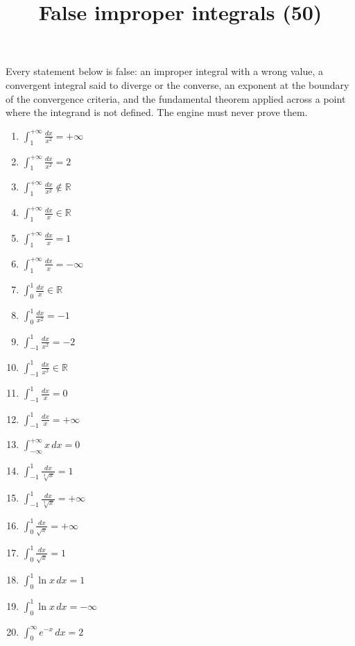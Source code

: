 \documentclass[11pt,a4paper]{article}
\title{False improper integrals (50)}
\author{}
\date{}
\begin{document}
\maketitle
Every statement below is false: an improper integral with a wrong value, a convergent integral said to diverge or the converse, an exponent at the boundary of the convergence criteria, and the fundamental theorem applied across a point where the integrand is not defined. The engine must never prove them.

\begin{enumerate}
\item $\displaystyle \int_{1}^{+\infty} \frac{dx}{x^{2}} = +\infty$
\item $\displaystyle \int_{1}^{+\infty} \frac{dx}{x^{2}} = 2$
\item $\displaystyle \int_{1}^{+\infty} \frac{dx}{x^{2}} \notin \mathbb{R}$
\item $\displaystyle \int_{1}^{+\infty} \frac{dx}{x} \in \mathbb{R}$
\item $\displaystyle \int_{1}^{+\infty} \frac{dx}{x} = 1$
\item $\displaystyle \int_{1}^{+\infty} \frac{dx}{x} = -\infty$
\item $\displaystyle \int_{0}^{1} \frac{dx}{x} \in \mathbb{R}$
\item $\displaystyle \int_{0}^{1} \frac{dx}{x^{2}} = -1$
\item $\displaystyle \int_{-1}^{1} \frac{dx}{x^{2}} = -2$
\item $\displaystyle \int_{-1}^{1} \frac{dx}{x^{2}} \in \mathbb{R}$
\item $\displaystyle \int_{-1}^{1} \frac{dx}{x} = 0$
\item $\displaystyle \int_{-1}^{1} \frac{dx}{x} = +\infty$
\item $\displaystyle \int_{-\infty}^{+\infty} x \, dx = 0$
\item $\displaystyle \int_{-1}^{1} \frac{dx}{\sqrt[3]{x}} = 1$
\item $\displaystyle \int_{-1}^{1} \frac{dx}{\sqrt[3]{x}} = +\infty$
\item $\displaystyle \int_{0}^{1} \frac{dx}{\sqrt{x}} = +\infty$
\item $\displaystyle \int_{0}^{1} \frac{dx}{\sqrt{x}} = 1$
\item $\displaystyle \int_{0}^{1} \ln x \, dx = 1$
\item $\displaystyle \int_{0}^{1} \ln x \, dx = -\infty$
\item $\displaystyle \int_{0}^{\infty} e^{-x} \, dx = 2$

\end{enumerate}
\end{document}

